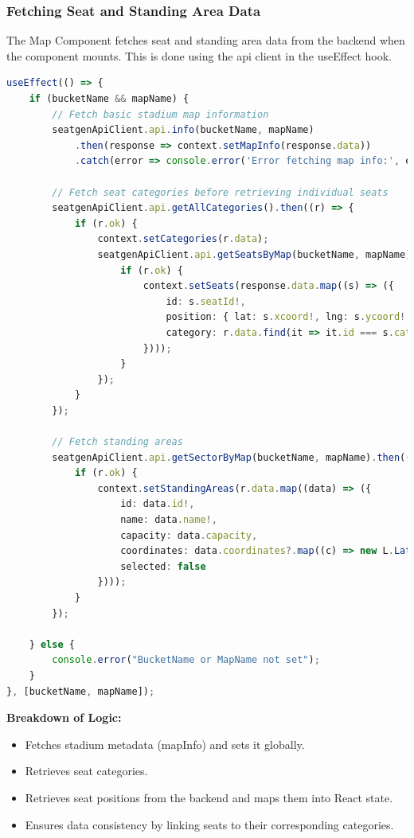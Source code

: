 \subsubsection{Fetching Seat and Standing Area Data}

The Map Component fetches seat and standing area data from the backend when the component mounts. This is done using the api client in the useEffect hook.

\begin{lstlisting}[language=TypeScript, caption=Fetching Seat and Category Data, label=lst:fetch-seats]
useEffect(() => {
    if (bucketName && mapName) {
        // Fetch basic stadium map information
        seatgenApiClient.api.info(bucketName, mapName)
            .then(response => context.setMapInfo(response.data))
            .catch(error => console.error('Error fetching map info:', error));

        // Fetch seat categories before retrieving individual seats
        seatgenApiClient.api.getAllCategories().then((r) => {
            if (r.ok) {
                context.setCategories(r.data);
                seatgenApiClient.api.getSeatsByMap(bucketName, mapName).then(response => {
                    if (r.ok) {
                        context.setSeats(response.data.map((s) => ({
                            id: s.seatId!,
                            position: { lat: s.xcoord!, lng: s.ycoord! },
                            category: r.data.find(it => it.id === s.categoryId) ?? null
                        })));
                    }
                });
            }
        });

        // Fetch standing areas
        seatgenApiClient.api.getSectorByMap(bucketName, mapName).then((r) => {
            if (r.ok) {
                context.setStandingAreas(r.data.map((data) => ({
                    id: data.id!,
                    name: data.name!,
                    capacity: data.capacity,
                    coordinates: data.coordinates?.map((c) => new L.LatLng(c.x!, c.y!)) ?? [],
                    selected: false
                })));
            }
        });

    } else {
        console.error("BucketName or MapName not set");
    }
}, [bucketName, mapName]);
\end{lstlisting}

\textbf{Breakdown of Logic:}
\begin{itemize}
    \item Fetches stadium metadata (mapInfo) and sets it globally.
    \item Retrieves seat categories.
    \item Retrieves seat positions from the backend and maps them into React state.
    \item Ensures data consistency by linking seats to their corresponding categories.
\end{itemize}

